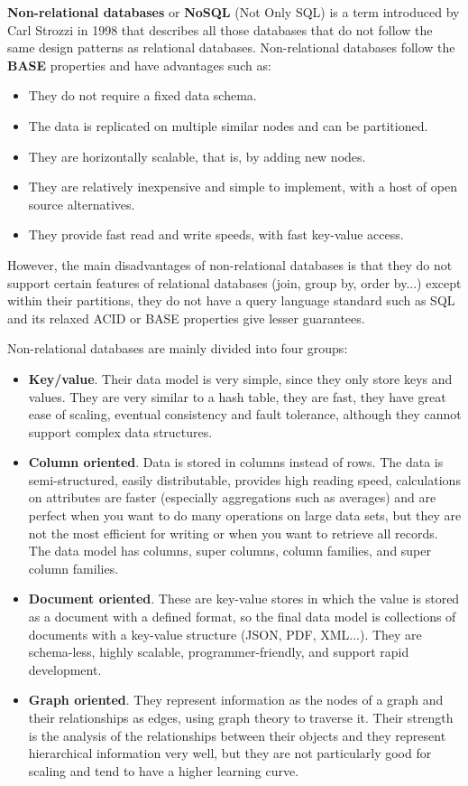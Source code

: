 \nonzeroparskip \textbf{Non-relational databases} or \textbf{NoSQL} (Not Only SQL) is a term introduced by Carl Strozzi in 1998 that describes all those databases that do not follow the same design patterns as relational databases. Non-relational databases follow the \textbf{BASE} properties and have advantages such as:
\begin{itemize}
	\item They do not require a fixed data schema.
	\item The data is replicated on multiple similar nodes and can be partitioned.
	\item They are horizontally scalable, that is, by adding new nodes.
	\item They are relatively inexpensive and simple to implement, with a host of open source alternatives.
	\item They provide fast read and write speeds, with fast key-value access.
\end{itemize}

\nonzeroparskip However, the main disadvantages of non-relational databases is that they do not support certain features of relational databases (join, group by, order by...) except within their partitions, they do not have a query language standard such as SQL and its relaxed ACID or BASE properties give lesser guarantees.

\nonzeroparskip Non-relational databases are mainly divided into four groups:
\begin{itemize}
	\item \textbf{Key/value}. Their data model is very simple, since they only store keys and values. They are very similar to a hash table, they are fast, they have great ease of scaling, eventual consistency and fault tolerance, although they cannot support complex data structures.
	\item \textbf{Column oriented}. Data is stored in columns instead of rows. The data is semi-structured, easily distributable, provides high reading speed, calculations on attributes are faster (especially aggregations such as averages) and are perfect when you want to do many operations on large data sets, but they are not the most efficient for writing or when you want to retrieve all records. The data model has columns, super columns, column families, and super column families.
	\item \textbf{Document oriented}. These are key-value stores in which the value is stored as a document with a defined format, so the final data model is collections of documents with a key-value structure (JSON, PDF, XML...). They are schema-less, highly scalable, programmer-friendly, and support rapid development.
	\item \textbf{Graph oriented}. They represent information as the nodes of a graph and their relationships as edges, using graph theory to traverse it. Their strength is the analysis of the relationships between their objects and they represent hierarchical information very well, but they are not particularly good for scaling and tend to have a higher learning curve.
\end{itemize}

